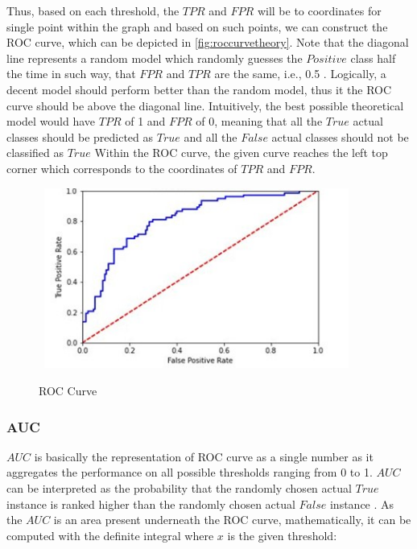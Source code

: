 Thus, based on each threshold, the $TPR$ and $FPR$ will be to coordinates for single point within the graph and based on such points, we can construct the ROC curve, which can be depicted in \autoref{fig:roccurvetheory}.
Note that the diagonal line represents a random model which randomly guesses the $Positive$ class half the time in such way, that $FPR$ and $TPR$ are the same, i.e., 0.5 \citep{fawcett2006introduction}.
Logically, a decent model should perform better than the random model, thus it the ROC curve should be above the diagonal line.
Intuitively, the best possible theoretical model would have $TPR$ of 1 and $FPR$ of 0, meaning that all the $True$ actual classes should be predicted as $True$ and all the $False$ actual classes should not be classified as $True$
 Within the ROC curve, the given curve reaches the left top corner which corresponds to the coordinates of $TPR$ and $FPR$.

 \begin{figure}[H]
    \centering
    \caption{ROC Curve}\vspace{0.5em}
    \label{fig:roccurvetheory}\
    \includegraphics[width=100mm]{Figures/ROC_theory.jpg}

    \vspace{-1em}
\end{figure}
\subsubsection{AUC}

$AUC$ is basically the representation of ROC curve as a single number as it aggregates the performance on all possible thresholds ranging from 0 to 1.
$AUC$ can be interpreted as the probability that the randomly chosen actual $True$ instance is ranked higher than the randomly chosen actual $False$ instance \citep{janitza2013auc}.
As the $AUC$ is an area present underneath the ROC curve, mathematically, it can be computed with the definite integral where $x$ is the given threshold:

